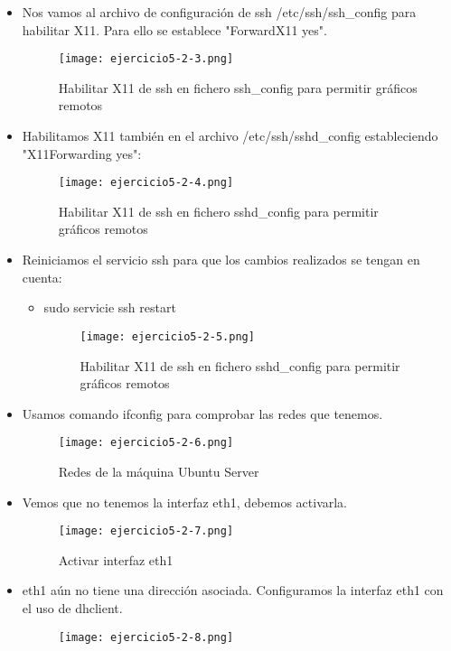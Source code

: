 	\begin{itemize}
		\item Nos vamos al archivo de configuración de ssh /etc/ssh/ssh\_config para habilitar X11. Para ello se establece "ForwardX11 yes".	
			\begin{figure}[H] 
				\centering
				\texttt{[image: ejercicio5-2-3.png]} 
				\label{figura39} 	
				\caption{Habilitar X11 de ssh en fichero ssh\_config para permitir gráficos remotos}
			\end{figure}	
		\item Habilitamos X11 también en el archivo /etc/ssh/sshd\_config estableciendo "X11Forwarding yes":
			\begin{figure}[H] 
				\centering
				\texttt{[image: ejercicio5-2-4.png]} 
				\label{figura40} 	
				\caption{Habilitar X11 de ssh en fichero sshd\_config para permitir gráficos remotos}
			\end{figure}
		\item Reiniciamos el servicio ssh para que los cambios realizados se tengan en cuenta:
			\begin{itemize}
				\item sudo servicie ssh restart
				\begin{figure}[H] 
					\centering
					\texttt{[image: ejercicio5-2-5.png]} 
					\label{figura41} 
					\caption{Habilitar X11 de ssh en fichero sshd\_config para permitir gráficos remotos}
				\end{figure}
			\end{itemize}
		\item Usamos comando ifconfig\cite{ejercicio5-7} para comprobar las redes que tenemos.
			\begin{figure}[H] 
				\centering
				\texttt{[image: ejercicio5-2-6.png]} 
				\label{figura42} 
				\caption{Redes de la máquina Ubuntu Server}
			\end{figure}
		\item Vemos que no tenemos la interfaz eth1, debemos activarla.
			\begin{figure}[H] 
				\centering
				\texttt{[image: ejercicio5-2-7.png]} 
				\label{figura43} 
				\caption{Activar interfaz eth1}
			\end{figure}
		\item eth1 aún no tiene una dirección asociada. Configuramos la interfaz eth1 con el uso de dhclient\cite{ejercicio5-8}.
			\begin{figure}[H] 
				\centering
				\texttt{[image: ejercicio5-2-8.png]} 

\end{figure}
\end{itemize}
